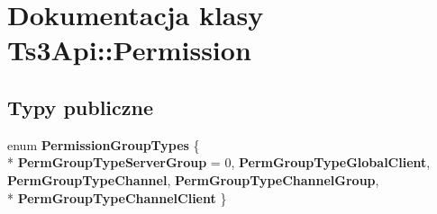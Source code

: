 \hypertarget{class_ts3_api_1_1_permission}{}\section{Dokumentacja klasy Ts3\+Api\+:\+:Permission}
\label{class_ts3_api_1_1_permission}
\subsection*{Typy publiczne}
\begin{DoxyCompactItemize}
\item 
enum {\bfseries Permission\+Group\+Types} \{ \\*
{\bfseries Perm\+Group\+Type\+Server\+Group} = 0, 
{\bfseries Perm\+Group\+Type\+Global\+Client}, 
{\bfseries Perm\+Group\+Type\+Channel}, 
{\bfseries Perm\+Group\+Type\+Channel\+Group}, 
\\*
{\bfseries Perm\+Group\+Type\+Channel\+Client}
 \}\hypertarget{class_ts3_api_1_1_permission_a9ce809facb0ce3404580d1bd485a0602}{}\label{class_ts3_api_1_1_permission_a9ce809facb0ce3404580d1bd485a0602}

\end{DoxyCompactItemize}
